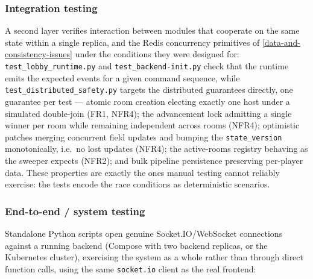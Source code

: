 \documentclass{scrartcl}
\begin{document}
\subsubsection{Integration testing}\label{integration-testing}

A second layer verifies interaction between modules that cooperate on the same
state within a single replica, and the Redis concurrency primitives of
\cref{data-and-consistency-issues} under the conditions they were designed for:
\texttt{test\_lobby\_runtime.py} and \texttt{test\_backend-init.py} check that the
runtime emits the expected events for a given command sequence, while
\texttt{test\_distributed\_safety.py} targets the distributed guarantees directly,
one guarantee per test --- atomic room creation electing exactly one host under a
simulated double-join (FR1, NFR4); the advancement lock admitting a single winner
per room while remaining independent across rooms (NFR4); optimistic patches
merging concurrent field updates and bumping the \texttt{state\_version}
monotonically, i.e.\ no lost updates (NFR4); the active-rooms registry behaving as
the sweeper expects (NFR2); and bulk pipeline persistence preserving per-player
data. These properties are exactly the ones manual testing cannot reliably
exercise: the tests encode the race conditions as deterministic scenarios.

\subsubsection{End-to-end / system testing}\label{e2e-testing}

Standalone Python scripts open genuine Socket.IO/WebSocket connections against a
running backend (Compose with two backend replicas, or the Kubernetes cluster),
exercising the system as a whole rather than through direct function calls, using
the same \texttt{socket.io} client as the real frontend:
\end{document}
